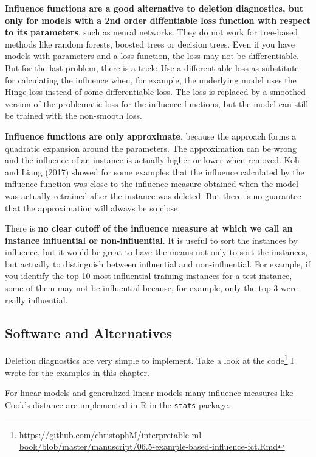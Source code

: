 \documentclass[
  10pt,
]{scrbook}
\renewcommand{\href}[2]{#2\footnote{\url{#1}}}
\begin{document}
\textbf{Influence functions are a good alternative to deletion diagnostics, but only for models with a 2nd order diffentiable loss function with respect to its parameters}, such as neural networks.
They do not work for tree-based methods like random forests, boosted trees or decision trees.
Even if you have models with parameters and a loss function, the loss may not be differentiable.
But for the last problem, there is a trick:
Use a differentiable loss as substitute for calculating the influence when, for example, the underlying model uses the Hinge loss instead of some differentiable loss.
The loss is replaced by a smoothed version of the problematic loss for the influence functions, but the model can still be trained with the non-smooth loss.

\textbf{Influence functions are only approximate}, because the approach forms a quadratic expansion around the parameters.
The approximation can be wrong and the influence of an instance is actually higher or lower when removed.
Koh and Liang (2017) showed for some examples that the influence calculated by the influence function was close to the influence measure obtained when the model was actually retrained after the instance was deleted.
But there is no guarantee that the approximation will always be so close.

There is \textbf{no clear cutoff of the influence measure at which we call an instance influential or non-influential}.
It is useful to sort the instances by influence, but it would be great to have the means not only to sort the instances, but actually to distinguish between influential and non-influential.
For example, if you identify the top 10 most influential training instances for a test instance, some of them may not be influential because, for example, only the top 3 were really influential.

\hypertarget{software-and-alternatives-5}{%
\subsection{Software and Alternatives}\label{software-and-alternatives-5}}

Deletion diagnostics are very simple to implement.
Take a look at \href{https://github.com/christophM/interpretable-ml-book/blob/master/manuscript/06.5-example-based-influence-fct.Rmd}{the code} I wrote for the examples in this chapter.

For linear models and generalized linear models many influence measures like Cook's distance are implemented in R in the \texttt{stats} package.
\end{document}

